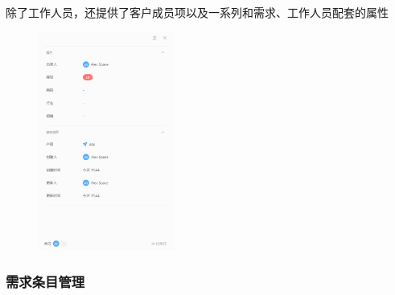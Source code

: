 \documentclass[12pt, a4paper, oneside]{ctexart}
\begin{document}
除了工作人员，还提供了客户成员项以及一系列和需求、工作人员配套的属性
\begin{figure}[H]
    \centering
    \includegraphics[width=0.4\textwidth]{../pic/1/1.5.png}
\end{figure}

\subsubsection{需求条目管理}
\end{document}
